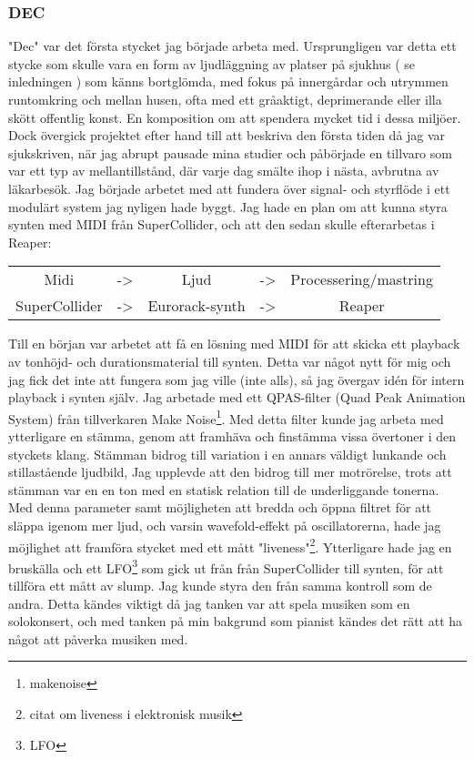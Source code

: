 \documentclass{article}
\begin{document}
	\subsubsection{DEC}
	"Dec" var det första stycket jag började arbeta med. Ursprungligen var detta ett stycke som skulle vara en
	form av ljudläggning av platser på sjukhus ( se inledningen ) som känns bortglömda, med fokus på
	innergårdar och utrymmen runtomkring och mellan husen, ofta med ett gråaktigt, deprimerande eller illa
	skött offentlig konst. En komposition om att spendera mycket tid i dessa miljöer. Dock övergick projektet
	efter hand till att beskriva den första tiden då jag var sjukskriven, när jag abrupt pausade mina studier
	och påbörjade en tillvaro som var ett typ av mellantillstånd, där varje dag smälte ihop i nästa, avbrutna
	av läkarbesök. 
		Jag började arbetet med att fundera över signal- och styrflöde i ett modulärt system jag nyligen hade
		byggt. Jag hade en plan om att kunna styra synten med MIDI från SuperCollider, och att
		den sedan skulle efterarbetas i Reaper:
		\begin{center}
			\begin{tabular}{ c c c c c }
				Midi		  & -> & Ljud			& -> & Processering/mastring \\
				SuperCollider & -> & Eurorack-synth & -> & Reaper
			\end{tabular}
		\end{center}

		Till en början var arbetet att få en lösning med MIDI för att skicka ett playback av tonhöjd- och
		durationsmaterial till synten. Detta var något nytt för mig och jag fick det inte att fungera som jag
		ville (inte alls), så jag övergav idén för intern playback i synten själv. 
		Jag arbetade med ett QPAS-filter (Quad Peak Animation System) från tillverkaren Make
		Noise\footnote{makenoise}. Med detta filter kunde jag arbeta med ytterligare en stämma, genom att
		framhäva och finstämma vissa övertoner i den styckets klang. Stämman bidrog till variation i en
		annars väldigt lunkande och stillastående ljudbild, Jag upplevde att den bidrog till mer motrörelse,
		trots att stämman var en en ton med en statisk relation till de underliggande tonerna. Med denna
		parameter samt möjligheten att bredda och öppna filtret för att släppa igenom mer ljud, och varsin
		wavefold-effekt på oscillatorerna, hade jag möjlighet att framföra stycket med ett mått
		"liveness"\footnote{citat om liveness i elektronisk musik}. Ytterligare hade jag en bruskälla och ett
		LFO\footnote{LFO} som gick ut från från SuperCollider till synten, för att tillföra ett mått av slump.
		Jag kunde styra den från samma kontroll som de andra. Detta kändes viktigt då jag tanken var att
		spela musiken som en solokonsert, och med tanken på min bakgrund som pianist kändes det rätt att ha
		något att påverka musiken med. 
\end{document}
